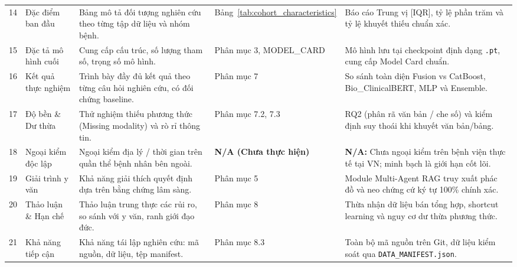 \begin{table}[htbp]
\begin{tabularx}{\textwidth}{@{}cp{2.4cm}p{4.2cm}p{1.8cm}X@{}}
14 & Đặc điểm ban đầu & Bảng mô tả đối tượng nghiên cứu theo từng tập dữ liệu và nhóm bệnh. & Bảng~\ref{tab:cohort_characteristics} & Báo cáo Trung vị [IQR], tỷ lệ phần trăm và tỷ lệ khuyết thiếu chuẩn xác. \\
15 & Đặc tả mô hình cuối & Cung cấp cấu trúc, số lượng tham số, trọng số mô hình. & Phân mục 3, MODEL\_CARD & Mô hình lưu tại checkpoint định dạng \texttt{.pt}, cung cấp Model Card chuẩn. \\
16 & Kết quả thực nghiệm & Trình bày đầy đủ kết quả theo từng câu hỏi nghiên cứu, có đối chứng baseline. & Phân mục 7 & So sánh toàn diện Fusion vs CatBoost, Bio\_ClinicalBERT, MLP và Ensemble. \\
17 & Độ bền \& Dư thừa & Thử nghiệm thiếu phương thức (Missing modality) và rò rỉ thông tin. & Phân mục 7.2, 7.3 & RQ2 (phân rã văn bản / che số) và kiểm định suy thoái khi khuyết văn bản/bảng. \\
18 & Ngoại kiểm độc lập & Ngoại kiểm địa lý / thời gian trên quần thể bệnh nhân bên ngoài. & \textbf{N/A (Chưa thực hiện)} & \textbf{N/A:} Chưa ngoại kiểm trên bệnh viện thực tế tại VN; minh bạch là giới hạn cốt lõi. \\
19 & Giải trình y văn & Khả năng giải thích quyết định dựa trên bằng chứng lâm sàng. & Phân mục 5 & Module Multi-Agent RAG truy xuất phác đồ và neo chứng cứ ký tự 100\% chính xác. \\
20 & Thảo luận \& Hạn chế & Thảo luận trung thực các rủi ro, so sánh với y văn, ranh giới đạo đức. & Phân mục 8 & Thừa nhận dữ liệu bán tổng hợp, shortcut learning và nguy cơ dư thừa phương thức. \\
21 & Khả năng tiếp cận & Khả năng tái lập nghiên cứu: mã nguồn, dữ liệu, tệp manifest. & Phân mục 8.3 & Toàn bộ mã nguồn trên Git, dữ liệu kiểm soát qua \texttt{DATA\_MANIFEST.json}. \\
\bottomrule
\end{tabularx}
\end{table}
